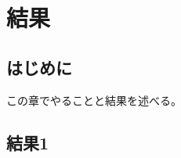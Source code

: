\documentclass[../thesis]{subfiles}
\begin{document}
\chapter{結果}
\section{はじめに}
この章でやることと結果を述べる。
\section{結果1}
\end{document}
